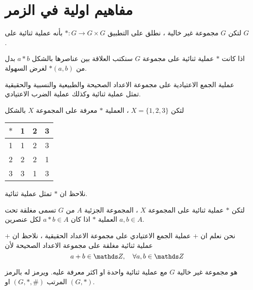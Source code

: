 \chapter{مفاهيم اولية في الزمر}

\begin{definition}[]
	لتكن $G$ مجموعة غير خالية ، نطلق على التطبيق $*:G\to G\times G$ بأنه عملية ثنائية على $G$.
\end{definition}

\begin{note}
	اذا كانت $*$ عملية ثنائية على مجموعة $G$ سنكتب العلاقة بين عناصرها بالشكل $a*b$ بدل من $*(a, b)$ لغرض السهولة.
\end{note}

\begin{example}
عملية الجمع الاعتيادية على مجموعة الاعداد الصحيحة والطبيعية والنسبية والحقيقية تمثل عملية ثنائية وكذلك عملية الضرب الاعتيادي. 
\end{example}

\begin{example}
	لتكن $X = \{1,2,3\}$ ، العملية $*$ معرفة على المجموعة $X$ بالشكل
	\begin{table}[H]
		\renewcommand{\arraystretch}{1.4}
		\centering
		\setLR
		\begin{tabular}{|c|c|c|c|}
			\hline
			$*$ & 1&2&3\\
			\hline
			1&1&2&3\\
			\hline
			2&2&2&1\\
			\hline
			3&3&1&3\\
			\hline
		\end{tabular}
	\end{table}
	\setRL\noindent
	نلاحظ ان $*$ تمثل عملية ثنائية.
\end{example}

\begin{definition}[]
	لتكن $*$ عملية ثنائية على المجموعة $X$ ، المجموعة الجزئية $A$ من $G$ تسمى مغلقة تحت العملية $*$ اذا كان $a*b \in A$ لكل عنصرين $a, b\in A$.
\end{definition}

\begin{example}
	نحن نعلم ان $+$ عملية الجمع الاعتيادي على مجموعة الاعداد الحقيقية ، نلاحظ ان $+$ عملية ثنائية مغلقة على مجموعة الاعداد الصحيحة لأن
	\[
	a+b \in \Z ,\quad \forall a, b\in \Z
	\]
\end{example}

\begin{definition}[]
	هو مجموعة غير خالية $G$ مع عملية ثنائية واحدة او اكثر معرفة عليه. ويرمز له بالرمز المرتب $(G, *, \#)$ او $(G, *)$.
\end{definition}

